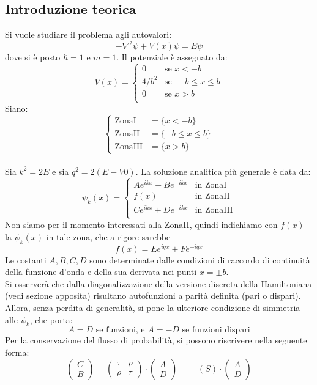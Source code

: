 \subsection*{Introduzione teorica}
Si vuole studiare il problema agli autovalori:
$$ -\nabla^2\psi + V(x)\psi = E \psi $$
dove si è posto $\hbar = 1$ e $m = 1$. Il potenziale è assegnato da:
$$ V(x)  = \begin{cases}
        0       & \mbox{se } x<-b \\
        4/b^2   & \mbox{se } -b \leq x \leq b \\
        0       & \mbox{se } x>b \\
         \end{cases}
$$
Siano:
$$ \begin{cases}
    \mbox{ZonaI} & = \{x<-b \} \\
    \mbox{ZonaII} & = \{-b \leq x \leq b\} \\
    \mbox{ZonaIII} & = \{x>b\}
\end{cases} $$
\\
Sia $k^2 = 2E$ e sia $q^2 = 2(E-V0)$. La soluzione analitica più generale è data da:
$$\psi_k(x) =
    \begin{cases}
        Ae^{ikx}+Be^{-ikx} & \mbox{in ZonaI} \\
        f(x) & \mbox{in ZonaII} \\
        Ce^{ikx}+De^{-ikx} & \mbox{in ZonaIII} \\
    \end{cases}
$$
Non siamo per il momento interessati alla ZonaII, quindi indichiamo con
$f(x)$ la $\psi_k(x)$ in tale zona, che a rigore sarebbe
    $$f(x)= Ee^{iqx}+Fe^{-iqx}$$
Le costanti $A,B,C,D$ sono determinate dalle condizioni di raccordo di continuità della
funzione d'onda e della sua derivata nei punti $x=\pm b$.\\
Si osserverà che dalla diagonalizzazione della versione discreta della Hamiltoniana
(vedi sezione apposita) risultano autofunzioni a parità definita (pari o dispari).
Allora, senza perdita di generalità, si pone la ulteriore condizione di simmetria alle $\psi_k$, che porta:
    $$ A = D \mbox{ se funzioni, e } A = -D \mbox{ se funzioni dispari}$$
Per la conservazione del flusso di probabilità, si possono riscrivere nella seguente forma:
$$
    \begin{pmatrix} C \\ B \end{pmatrix} =
    \begin{pmatrix} \tau & \rho \\ \rho & \tau \end{pmatrix} \cdot
    \begin{pmatrix} A \\ D \end{pmatrix} = \quad (S)\cdot \begin{pmatrix} A \\ D \end{pmatrix}
$$

